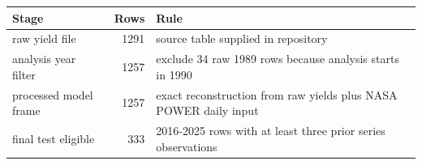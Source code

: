 \begin{tabular}{lrl}
\toprule
Stage & Rows & Rule \\
\midrule
raw yield file & 1291 & source table supplied in repository \\
analysis year filter & 1257 & exclude 34 raw 1989 rows because analysis starts in 1990 \\
processed model frame & 1257 & exact reconstruction from raw yields plus NASA POWER daily input \\
final test eligible & 333 & 2016-2025 rows with at least three prior series observations \\
\bottomrule
\end{tabular}

